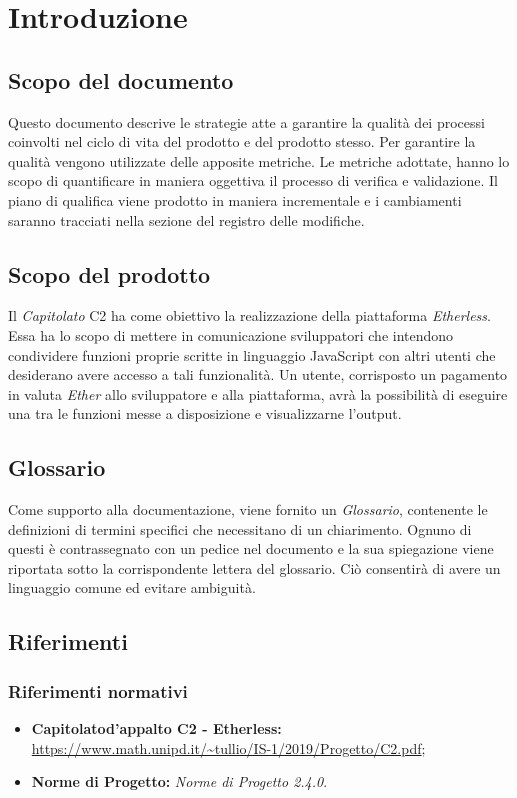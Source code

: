 \setlength\LTleft{0cm}
\section{Introduzione}

\subsection{Scopo del documento}
Questo documento descrive le strategie atte a garantire la qualità dei processi coinvolti nel ciclo di vita del prodotto e del prodotto stesso. Per garantire la qualità vengono utilizzate delle apposite metriche. Le metriche adottate, hanno lo scopo di quantificare in maniera oggettiva il processo di verifica e validazione. Il piano di qualifica viene prodotto in maniera incrementale e i cambiamenti saranno tracciati nella sezione del registro delle modifiche.


\subsection{Scopo del prodotto}
Il \textit{Capitolato\glo} C2 ha come obiettivo la realizzazione della piattaforma \textit{Etherless}. Essa ha lo scopo di mettere in comunicazione sviluppatori che intendono condividere funzioni proprie scritte in linguaggio JavaScript con altri utenti che desiderano avere accesso a tali funzionalità. Un utente, corrisposto un pagamento in valuta \textit{Ether\glo} allo sviluppatore e alla piattaforma, avrà la possibilità di eseguire una tra le funzioni messe a disposizione e visualizzarne l'output.

\subsection{Glossario}
Come supporto alla documentazione, viene fornito un \textit{Glossario}\docs,
contenente le definizioni di termini specifici che necessitano di un chiarimento.
Ognuno di questi è contrassegnato con un pedice \glo nel documento e la sua
spiegazione viene riportata sotto la corrispondente lettera del glossario. Ciò
consentir\`a di avere un linguaggio comune ed evitare ambiguità.

\subsection{Riferimenti}
\subsubsection{Riferimenti normativi}
\begin{itemize}
\item \textbf{Capitolato\glo d'appalto C2 - Etherless:} \url{https://www.math.unipd.it/~tullio/IS-1/2019/Progetto/C2.pdf};
\item \textbf{Norme di Progetto:} \textit{Norme di Progetto 2.4.0\docs}.
\end{itemize}
